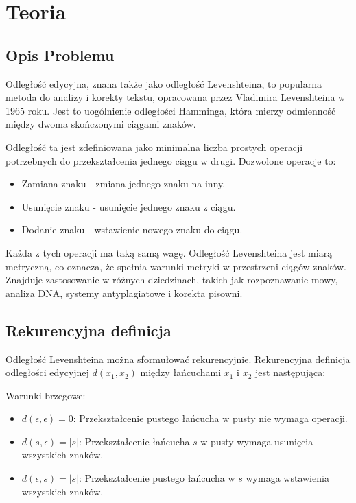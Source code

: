 \section{Teoria}
\subsection{Opis Problemu}
Odległość edycyjna, znana także jako odległość Levenshteina, to popularna metoda do analizy i korekty tekstu, opracowana przez Vladimira Levenshteina w 1965 roku\cite{levenshtein1966}. Jest to uogólnienie odległości Hamminga, która mierzy odmienność między dwoma skończonymi ciągami znaków.

\vspace{1em}

Odległość ta jest zdefiniowana jako minimalna liczba prostych operacji potrzebnych do przekształcenia jednego ciągu w drugi. Dozwolone operacje to:

\begin{itemize}
    \item Zamiana znaku - zmiana jednego znaku na inny.
    \item Usunięcie znaku - usunięcie jednego znaku z ciągu.
    \item Dodanie znaku - wstawienie nowego znaku do ciągu.
\end{itemize}

\vspace{1em}

Każda z tych operacji ma taką samą wagę. Odległość Levenshteina jest miarą metryczną, co oznacza, że spełnia warunki metryki w przestrzeni ciągów znaków. Znajduje zastosowanie w różnych dziedzinach, takich jak rozpoznawanie mowy, analiza DNA, systemy antyplagiatowe i korekta pisowni.

\subsection{Rekurencyjna definicja}
Odległość Levenshteina można sformułować rekurencyjnie. Rekurencyjna definicja odległości edycyjnej \(d(x_1, x_2)\) między łańcuchami \(x_1\) i \(x_2\) jest następująca:

\vspace{1em}

Warunki brzegowe:
\begin{itemize}
    \item \(d(\epsilon, \epsilon) = 0\): Przekształcenie pustego łańcucha w pusty nie wymaga operacji.
    \item \(d(s, \epsilon) = |s|\): Przekształcenie łańcucha \(s\) w pusty wymaga usunięcia wszystkich znaków.
    \item \(d(\epsilon, s) = |s|\): Przekształcenie pustego łańcucha w \(s\) wymaga wstawienia wszystkich znaków.
\end{itemize}

